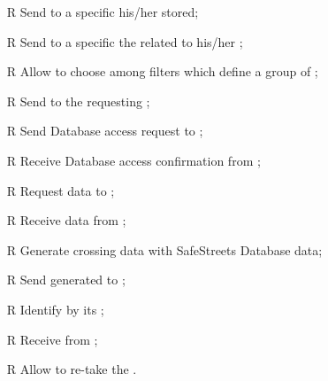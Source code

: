 \documentclass[../../../rasd.tex]{subfiles}
\begin{document}
\begin{itemize}
	\item[R\subs{21}]Send to a specific  his/her  stored;
	\item[R\subs{22}]Send to a specific  the  related to his/her ;
	\item[R\subs{23}]Allow  to choose among filters which define a group of ;
	\item[R\subs{24}]Send  to the requesting ;
	\item[R\subs{25}]Send  Database access request to ; 
	\item[R\subs{26}]Receive  Database access confirmation from ;
	\item[R\subs{27}]Request  data to ;
	\item[R\subs{28}]Receive  data from ;
	\item[R\subs{29}]Generate  crossing   data with SafeStreets Database data;
	\item[R\subs{30}]Send generated  to ;
	\item[R\subs{31}]Identify  by its ;
	\item[R\subs{32}]Receive  from ;
	\item[R\subs{33}]Allow  to re-take the .

	
\end{itemize}
\end{document}
